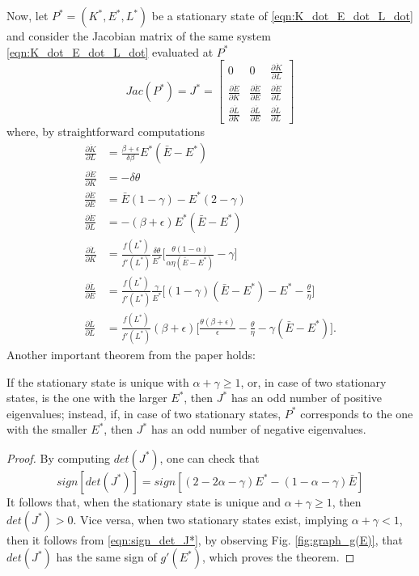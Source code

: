 Now, let $P^*=(K^*,E^*,L^*)$ be a stationary state of \eqref{eqn:K_dot_E_dot_L_dot} and consider the Jacobian matrix of the same system \eqref{eqn:K_dot_E_dot_L_dot} evaluated at $P^*$
$$
Jac(P^*)=J^* =
\begin{bmatrix}
	0 & 
	0 & 
	\frac{\partial\dot{K}}{\partial L} \\[1ex] %
	\frac{\partial\dot{E}}{\partial K} & 
	\frac{\partial\dot{E}}{\partial E} & 
	\frac{\partial\dot{E}}{\partial L} \\[1ex]
	\frac{\partial\dot{L}}{\partial K} & 
	\frac{\partial\dot{L}}{\partial E} & 
	\frac{\partial\dot{L}}{\partial L}
\end{bmatrix}
$$
where, by straightforward computations
\begin{equation} \label{eqn:part_deriv_Kdot_Ldot_Edot}
	\begin{split}
		\frac{\partial\dot{K}}{\partial L} &= \frac{\beta+\epsilon}{\delta\beta}E^*(\bar{E}-E^*)\\
		\frac{\partial\dot{E}}{\partial K} &=-\delta\theta \\
		\frac{\partial\dot{E}}{\partial E} &=\bar{E}(1-\gamma)-E^*(2-\gamma)\\
		\frac{\partial\dot{E}}{\partial L} &=-(\beta+\epsilon)E^*(\bar{E}-E^*)\\
		\frac{\partial\dot{L}}{\partial K} &=\frac{f(L^*)}{f'(L^*)}\frac{\delta\theta}{E^*} \Bigg[\frac{\theta(1-\alpha)}{\alpha\eta(\bar{E}-E^*)}-\gamma\Bigg]\\
		\frac{\partial\dot{L}}{\partial E} &=\frac{f(L^*)}{f'(L^*)}\frac{\gamma}{E^*} \Bigg[ (1-\gamma)(\bar{E}-E^*)-E^*-\frac{\theta}{\eta} \Bigg]\\
		\frac{\partial\dot{L}}{\partial L} &=\frac{f(L^*)}{f'(L^*)}(\beta+\epsilon) \Bigg[ \frac{\theta(\beta+\epsilon)}{\epsilon}-\frac{\theta}{\eta}-\gamma(\bar{E}-E^*) \Bigg].
	\end{split}
\end{equation}
Another important theorem from the paper holds: 
\begin{thm} \label{thm:num_eigenval_from_Jac}
	If the stationary state is unique with $\alpha+\gamma\geq1$, or, in case of two stationary states, is the one with the larger $E^*$, then $J^*$ has an odd number of positive eigenvalues; instead, if, in case of two stationary states, $P^*$ corresponds to the one with the smaller $E^*$, then $J^*$ has an odd number of negative eigenvalues.
\end{thm}
\begin{proof}
	By computing $det(J^*)$, one can check that
	\begin{equation} \label{eqn:sign_det_J*}
		sign[det(J^*)] = sign[(2-2\alpha-\gamma)E^*-(1-\alpha-\gamma)\bar{E}]
	\end{equation}
	It follows that, when the stationary state is unique and $\alpha+\gamma\geq1$, then $det(J^*) > 0$. Vice versa, when two stationary states exist, implying $\alpha+\gamma<1$, then it follows from \eqref{eqn:sign_det_J*}, by observing Fig. \ref{fig:graph_g(E)}, that $det(J^*)$ has the same sign of $g'(E^*)$, which proves the theorem. 
\end{proof}

